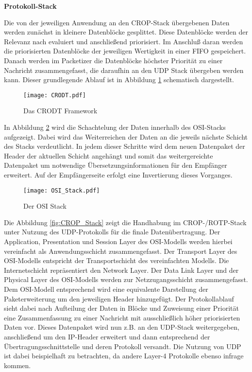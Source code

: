 \textbf{Protokoll-Stack} \label{sec:Konzept_Protocolstack}

Die von der jeweiligen Anwendung an den \gls{CROP}-Stack {\"u}bergebenen Daten
werden zun{\"a}chst in kleinere Datenbl{\"o}cke gesplittet. Diese Datenbl{\"o}cke
werden der Relevanz nach evaluiert und anschlie{\ss}end priorisiert.
Im Anschlu{\ss} daran werden die priorisierten Datenbl{\"o}cke der jeweiligen
Wertigkeit in einer \gls{FIFO} gespeichert. Danach werden im
Packetizer die Datenbl{\"o}cke h{\"o}chster Priorit{\"a}t zu einer
Nachricht zusammengefasst, die daraufhin an den \gls{UDP} Stack {\"u}bergeben
werden kann. Dieser grundlegende Ablauf ist in Abbildung \ref{fig:CRODT} schematisch
dargestellt.

\begin{figure}[H]
	\centering
	\texttt{[image: CRODT.pdf]}
	\caption[Das CRODT Framework]{Das CRODT Framework \cite{Daher}}
	\label{fig:CRODT}
\end{figure}

In Abbildung \ref{fig:OSI_Stack} wird die Schachtelung der Daten
innerhalb des OSI-Stacks aufgezeigt. Dabei wird das Weiterreichen der Daten an
die jeweils n{\"a}chste Schicht des Stacks verdeutlicht. In jedem dieser Schritte wird dem neuen
Datenpaket der Header der aktuellen Schicht angeh{\"a}ngt und somit das
weitergereichte Datenpaket um notwendige {\"U}bersetzungsinformationen f{\"u}r
den Empf{\"a}nger erweitert. Auf der Empf{\"a}ngerseite erfolgt eine Invertierung dieses
Vorganges. 

\begin{figure}[H]
	\centering
	\texttt{[image: OSI\_Stack.pdf]}
	\caption{Der OSI Stack}
	\label{fig:OSI_Stack}
\end{figure}
 
Die Abbildung \ref{fig:CROP_Stack} zeigt die Handhabung im CROP-/ROTP-Stack
unter Nutzung des \gls{UDP}-Protokolls f{\"u}r die finale Daten{\"u}bertragung. Der
Application, Presentation und Session Layer des OSI-Modells
werden hierbei vereinfacht als Anwendungsschicht zusammengefasst.
Der Transport Layer des OSI-Modells entspricht der Transportschicht des
vereinfachten Modells. Die Internetschicht repr{\"a}sentiert den Network
Layer.
Der Data Link Layer und der Physical Layer des OSI-Modells werden zur
Netzzugangsschicht zusammengefasst. Dem OSI-Modell entsprechend wird eine
equivalente Darstellung der Paketerweiterung um den jeweiligen Header
hinzugef{\"u}gt. Der Protokollablauf sieht dabei nach Aufteilung der Daten in
Bl{\"o}cke und Zuweisung einer Priorit{\"a}t eine Zusammenfassung zu einer
Nachricht mit ausschließlich höher priorisierten Daten vor. Dieses Datenpaket
wird nun z.B. an den \gls{UDP}-Stack weitergegeben, anschlie{\ss}end um den
\gls{IP}-Header erweitert und dann entsprechend der
{\"U}bertragungsschnittstelle und deren Protokoll versandt. Die Nutzung von UDP
ist dabei beispielhaft zu betrachten, da andere Layer-4 Protokolle ebenso
infrage kommen.


